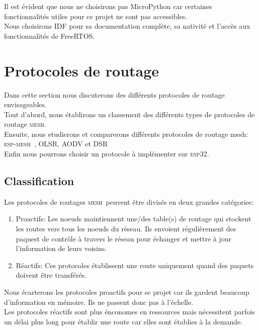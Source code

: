 \documentclass[a4paper, 12pt]{report}
\newcommand{\esp}{\textsc{esp32}}
\newcommand{\espmesh}{\textsc{esp-mesh}}
\newcommand{\mesh}{\textsc{mesh}}
\begin{document}
    Il est évident que nous ne choisirons pas MicroPython car certaines fonctionnalités utiles pour ce projet ne sont pas accessibles.\\
    Nous choisirons IDF pour sa documentation complète, sa nativité et l'accès aux fonctionnalités de FreeRTOS.
\section{Protocoles de routage}
    Dans cette section nous discuterons des différents protocoles de routage envisageables.\\
    Tout d'abord, nous établirons un classement des différents types de protocoles de routage \mesh. \\
    Ensuite, nous etudierons et comparerons différents protocoles de routage mesh: \espmesh\ \cite{esp-mesh_w}, OLSR\cite{olsr_w}, AODV\cite{aodv_w} et DSR\cite{dsr_w}\\
    Enfin nous pourrons choisir un protocole à implémenter sur \esp.\\
    
    \subsection{Classification}
    Les protocoles de routages \mesh\ peuvent être divisés en deux grandes catégories:
    \begin{enumerate}
        \item Proactifs: Les noeuds maintiennent une/des table(s) de routage
            qui stockent les routes vers tous les noeuds du réseau. 
            Ils envoient régulièrement des paquest de contrôle à travers le réseau pour échanger et 
            mettre à jour l'information de leurs voisins.
        \item Réactifs: Ces protocoles établissent une route uniquement quand des paquets
            doivent être transférés.
    \end{enumerate}
    Nous écarterons les protocoles proactifs pour se projet car ils gardent
    beaucoup d'information en mémoire. Ils ne passent donc pas à l'échelle.\\
    Les protocoles réactifs sont plus énconomes en ressources mais nécessitent parfois un délai plus long pour établir une route
    car elles sont établies à la demande.\\
    
\end{document}
